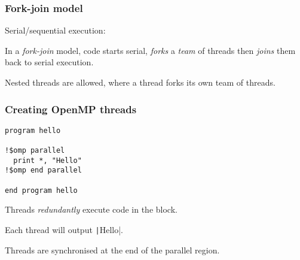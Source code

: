 \documentclass{beamer}
\begin{document}
\begin{frame}
\frametitle{Fork-join model}
Serial/sequential execution:
\begin{center}
\end{center}

In a \emph{fork-join} model, code starts serial, \emph{forks} a \emph{team} of threads then \emph{joins} them back to serial execution.
\begin{center}
\end{center}

Nested threads are allowed, where a thread forks its own team of threads.
\end{frame}

\begin{frame}[fragile]
\frametitle{Creating OpenMP threads}
\begin{verbatim}
program hello

!$omp parallel
  print *, "Hello"
!$omp end parallel

end program hello
\end{verbatim}

Threads \emph{redundantly} execute code in the block.

Each thread will output \texttt|Hello|.

Threads are synchronised at the end of the parallel region.

\end{frame}
\end{document}
